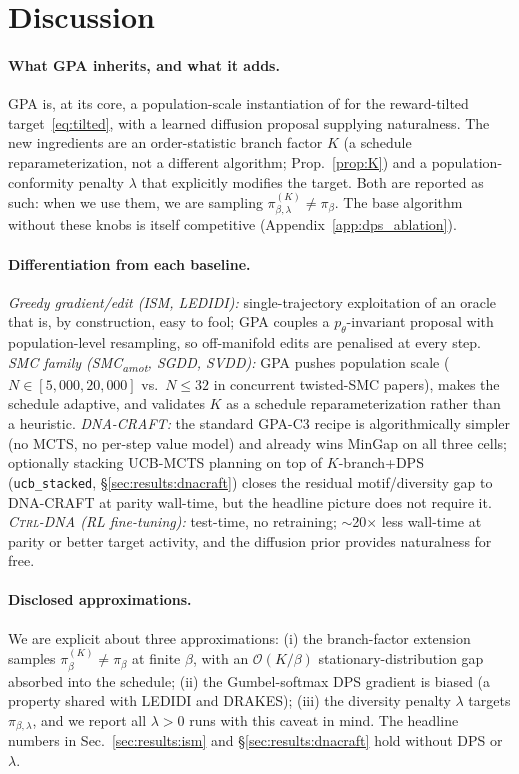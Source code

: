 \documentclass{article}
\theoremstyle{definition}
\theoremstyle{remark}
\newcommand{\gpa}{\textsc{GPA}\xspace}
\newcommand{\drakes}{\textsc{DRAKES}\xspace}
\newcommand{\ctrldna}{\textsc{Ctrl-DNA}\xspace}
\newcommand{\svdd}{\textsc{SVDD}\xspace}
\newcommand{\ism}{\textsc{ISM}\xspace}
\newcommand{\ledidi}{\textsc{LEDIDI}\xspace}
\newcommand{\dnacraft}{\textsc{DNA-CRAFT}\xspace}
\newcommand{\smcamot}{\textsc{SMC}\textsubscript{amot}\xspace}
\newcommand{\sgdd}{\textsc{SGDD}\xspace}
\begin{document}
\section{Discussion}\label{sec:disc}

\paragraph{What GPA inherits, and what it adds.}
\gpa{} is, at its core, a population-scale instantiation of \citet{delmoral2006smc} for the reward-tilted target~\eqref{eq:tilted}, with a learned diffusion proposal supplying naturalness. The new ingredients are an order-statistic branch factor $K$ (a schedule reparameterization, not a different algorithm; Prop.~\ref{prop:K}) and a population-conformity penalty $\lambda$ that explicitly modifies the target. Both are reported as such: when we use them, we are sampling $\pi_{\beta,\lambda}^{(K)}\!\neq\!\pi_\beta$. The base algorithm without these knobs is itself competitive (Appendix~\ref{app:dps_ablation}).

\paragraph{Differentiation from each baseline.}
\emph{Greedy gradient/edit (\ism, \ledidi):} single-trajectory exploitation of an oracle that is, by construction, easy to fool; \gpa{} couples a $p_\theta$-invariant proposal with population-level resampling, so off-manifold edits are penalised at every step. \emph{SMC family (\smcamot, \sgdd, \svdd):} \gpa{} pushes population scale ($N\!\in\![5{,}000,20{,}000]$ vs.\ $N\!\leq\!32$ in concurrent twisted-SMC papers), makes the schedule adaptive, and validates $K$ as a schedule reparameterization rather than a heuristic. \emph{\dnacraft{}:} the standard \gpa{}-C3 recipe is algorithmically simpler (no MCTS, no per-step value model) and already wins MinGap on all three cells; optionally stacking UCB-MCTS planning on top of $K$-branch+DPS (\texttt{ucb\_stacked}, \S\ref{sec:results:dnacraft}) closes the residual motif/diversity gap to \dnacraft{} at parity wall-time, but the headline picture does not require it. \emph{\ctrldna{} (RL fine-tuning):} test-time, no retraining; $\sim$20$\times$ less wall-time at parity or better target activity, and the diffusion prior provides naturalness for free.

\paragraph{Disclosed approximations.}
We are explicit about three approximations: (i) the branch-factor extension samples $\pi_\beta^{(K)}\!\neq\!\pi_\beta$ at finite $\beta$, with an $\mathcal{O}(K/\beta)$ stationary-distribution gap absorbed into the schedule; (ii) the Gumbel-softmax DPS gradient is biased (a property shared with \ledidi{} and \drakes{}); (iii) the diversity penalty $\lambda$ targets $\pi_{\beta,\lambda}$, and we report all $\lambda\!>\!0$ runs with this caveat in mind. The headline numbers in Sec.~\ref{sec:results:ism} and \S\ref{sec:results:dnacraft} hold without DPS or $\lambda$.
\end{document}

